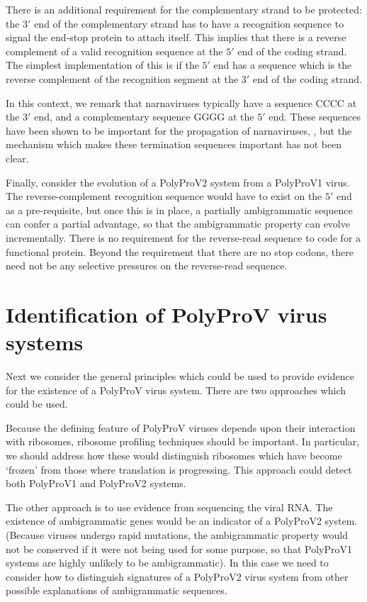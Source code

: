 \documentclass[12pt]{iopart}
\begin{document}
There is an additional requirement for the complementary strand to be protected: 
the $3'$ end of the complementary strand has to have a recognition sequence 
to signal the end-stop protein to attach itself. This implies that there is a reverse 
complement of a valid recognition sequence at the $5'$ end of the coding strand. 
The simplest implementation of this is if the $5'$ end has a sequence which is the 
reverse complement of the recognition segment at the $3'$ end of the coding strand.

In this context, we remark that narnaviruses typically have a sequence CCCC at the $3'$ end, 
and a complementary sequence GGGG at the $5'$ end. These sequences have been shown 
to be important for the propagation of narnaviruses, \cite{Est+03,Est+05}, but the mechanism 
which makes these termination sequences important has not been clear.

Finally, consider the evolution of a PolyProV2 system from a PolyProV1 virus. 
The reverse-complement recognition sequence would have to exist on the $5'$ end as a pre-requisite, but 
once this is in place, a partially ambigrammatic sequence can confer a partial advantage, 
so that the ambigrammatic property can evolve incrementally. 
There is no requirement for the reverse-read sequence to code for a functional protein. 
Beyond the requirement that there are no stop codons, there need not be any selective pressures on the 
reverse-read sequence. 

\section{Identification of PolyProV virus systems}
\label{sec: 3}

Next we consider the general principles which could be used to provide evidence 
for the existence of a PolyProV virus system. There are two approaches which could be used.

Because the defining feature of PolyProV viruses depends 
upon their interaction with ribosomes, ribosome profiling techniques should be important. 
In particular, we should address how these would distinguish ribosomes which have become 
\lq frozen' from those where translation is progressing. This 
approach could detect both PolyProV1 and PolyProV2 systems. 

The other approach is to use evidence from sequencing the viral RNA. 
The existence of ambigrammatic genes would be an indicator of a PolyProV2 system. 
(Because viruses undergo rapid mutations, the ambigrammatic property would not be conserved 
if it were not being used for some purpose, so that PolyProV1 systems are highly unlikely 
to be ambigrammatic). 
In this case we need to consider how to distinguish signatures of a PolyProV2 virus system 
from other possible explanations of ambigrammatic sequences.
 
\end{document}

